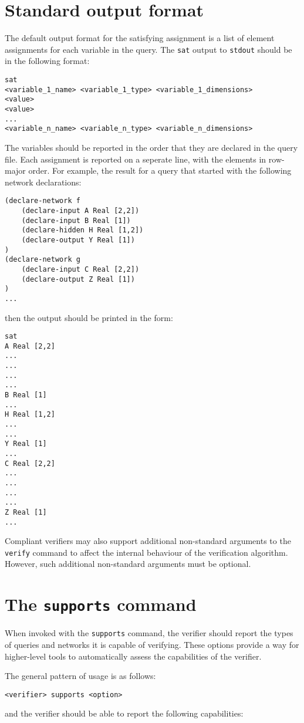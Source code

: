 \section*{Standard output format}
The default output format for the satisfying assignment is a list of element assignments for each variable in the query. The \texttt{sat} output to \texttt{stdout} should be in the following format:
\begin{lstlisting}[style=bash]
sat
<variable_1_name> <variable_1_type> <variable_1_dimensions>
<value>
<value>
...
<variable_n_name> <variable_n_type> <variable_n_dimensions>
\end{lstlisting}
The variables should be reported in the order that they are declared in the query file. Each assignment is reported on a seperate line, with the elements in row-major order. For example, the result for a \vnnlib{} query that started with the following network declarations:
\begin{lstlisting}[style=bash]
(declare-network f
    (declare-input A Real [2,2])
    (declare-input B Real [1])
    (declare-hidden H Real [1,2])
    (declare-output Y Real [1])
)
(declare-network g
    (declare-input C Real [2,2])
    (declare-output Z Real [1])
)
...
\end{lstlisting}
then the output should be printed in the form:
\begin{lstlisting}[style=bash]
sat
A Real [2,2]
... 
...
...
...
B Real [1]
...
H Real [1,2]
...
...
Y Real [1]
...
C Real [2,2]
...
...
...
...
Z Real [1]
...
\end{lstlisting}
Compliant verifiers may also support additional non-standard arguments to the \texttt{verify} command to affect the internal behaviour of the verification algorithm. However, such additional non-standard arguments must be optional.

\section{The \texttt{supports} command}
\label{sec:global_capabilities}

When invoked with the \texttt{supports} command, the verifier should report the types of queries and networks it is capable of verifying.
These options provide a way for higher-level tools to automatically assess the capabilities of the verifier.

The general pattern of usage is as follows:
\begin{lstlisting}[style=bash]
<verifier> supports <option>
\end{lstlisting}
and the verifier should be able to report the following capabilities:

